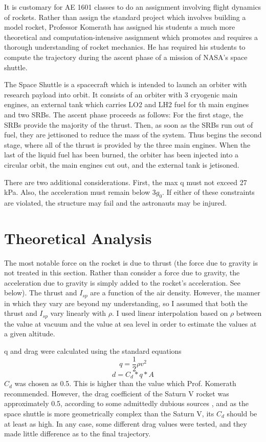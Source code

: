 \documentclass{article}
\begin{document}
It is customary for AE 1601 classes to do an assignment involving flight dynamics of rockets. Rather than assign the standard project which
involves building a model rocket, Professor Komerath has assigned his students a much more theoretical and computation-intensive assignment
which promotes and requires a thorough understanding of rocket mechanics. He has required his students to compute the trajectory during the
ascent phase of a mission of NASA's space shuttle.

The Space Shuttle is a spacecraft which is intended to launch an orbiter with research payload into orbit. It consists of an orbiter with
3 cryogenic main engines, an external tank which carries LO2 and LH2 fuel for th main engines and two SRBs. The ascent phase proceeds as follows:
For the first stage, the SRBs provide the majority of the thrust. Then, as soon as the SRBs run out of fuel, they are jettisoned to reduce the mass
of the system. Thus begins the second stage, where all of the thrust is provided by the three main engines. When the last of the liquid fuel
has been burned, the orbiter has been injected into a circular orbit, the main engines cut out, and the external tank is jetisoned.

There are two additional considerations. First, the max q must not exceed 27 kPa. Also, the acceleration must remain below $3g_0$. If
either of these constraints are violated, the structure may fail and the astronauts may be injured.

\section{Theoretical Analysis}

The most notable force on the rocket is due to thrust (the force due to gravity is not treated in this section. Rather than consider a force
due to gravity, the acceleration due to gravity is simply added to the rocket's acceleration. See below). The thrust and $I_{sp}$ are a function
of the air density. However, the manner in which they vary are beyond my understanding, so I assumed that both the thrust and $I_{sp}$ vary
linearly with $\rho$. I used linear interpolation based on $\rho$ between the value at vacuum and the value at sea level in order to estimate
the values at a given altitude.

q and drag were calculated using the standard equations
\[q = \frac{1}{2}\rho v^2\]
\[d = C_d*q*A\]
$C_d$ was chosen as 0.5. This is higher than the value which Prof. Komerath recommended. However, the drag coefficient of the Saturn V rocket
was approximately 0.5, according to some admittedly dubious sources \cite{forum}, and as the space shuttle is more geometrically complex than
the Saturn V, its $C_d$ should be at least as high. In any case, some different drag values were tested, and they made little difference as to
the final trajectory.
\end{document}
